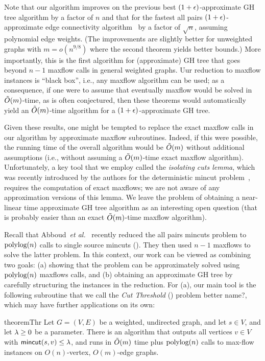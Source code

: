 Note that our algorithm improves on the previous best $(1+\epsilon)$-approximate GH tree algorithm by a factor of $n$ and that for the fastest all pairs $(1+\epsilon)$-approximate edge connectivity algorithm~\cite{AbboudKT20} by a factor of $\sqrt{n}$, assuming polynomial edge weights. (The improvements are slightly better for unweighted graphs with $m=o(n^{9/8})$ where the second theorem yields better bounds.) More importantly, this is the first algorithm for (approximate) GH tree that goes beyond $n-1$ maxflow calls in general weighted graphs. Uur reduction to maxflow instances is ``black box'', i.e., any maxflow algorithm can be used; as a consequence, if one were to assume that eventually maxflow would be solved in $\tilde{O}(m)$-time, as is often conjectured, then these theorems would automatically yield an $\tilde{O}(m)$-time algorithm for a $(1+\epsilon)$-approximate GH tree.

Given these results, one might be tempted to replace the exact maxflow calls in our algorithm by approximate maxflow subroutines. Indeed, if this were possible, the running time of the overall algorithm would be $\tilde{O}(m)$ without additional assumptions (i.e., without assuming a $\tilde{O}(m)$-time exact maxflow algorithm). Unfortunately, a key tool that we employ called the {\em isolating cuts lemma}, which was recently introduced by the authors for the deterministic mincut problem~\cite{LiP20}, requires the computation of exact maxflows; we are not aware of any approximation versions of this lemma. We leave the problem of obtaining a near-linear time approximate GH tree algorithm as an interesting open question (that is probably easier than an exact $\tilde{O}(m)$-time maxflow algorithm).


Recall that Abboud~{\em et al.}~\cite{AbboudKT20b} recently reduced the all pairs mincuts problem to $\textup{polylog}(n)$ calls to single source mincuts (\ssc). They then used $n-1$ maxflows to solve the latter problem. In this context, our work can be viewed as combining two goals: (a) showing that the \ssc problem can be approximately solved using $\textup{polylog}(n)$ maxflows calls, and (b) obtaining an approximate GH tree by carefully structuring the \ssc instances in the reduction. For (a), our main tool is the following subroutine that we call the {\em Cut Threshold} (\ct) problem \alert{better name?}, which may have further applications on its own:

\begin{restatable}{theorem}{Thr}
Let $G=(V,E)$ be a weighted, undirected graph, and let $s\in V$, and let $\lambda\ge0$ be a parameter. There is an algorithm that outputs all vertices $v\in V$ with $\textsf{\textup{mincut}}(s,v)\le\lambda$, and runs in $\tilde{O}(m)$ time plus $\textup{polylog}(n)$ calls to max-flow instances on $O(n)$-vertex, $O(m)$-edge graphs.
\end{restatable}

